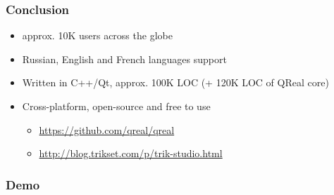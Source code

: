 \documentclass[xetex,mathserif,serif]{beamer}
\begin{document}
	\begin{frame}
		\frametitle{Conclusion}
		\begin{itemize}
			\item approx. 10K users across the globe
			\item Russian, English and French languages support
			\item Written in C++/Qt, approx. 100K LOC (+ 120K LOC of QReal core)
			\item Cross-platform, open-source and free to use
			\begin{itemize}
				\item \href{https://github.com/qreal/qreal}{https://github.com/qreal/qreal}
				\item \href{http://blog.trikset.com/p/trik-studio.html}{http://blog.trikset.com/p/trik-studio.html}
			\end{itemize}
		\end{itemize}
	\end{frame}

	\begin{frame}
		\frametitle{Demo}
		\center{\Huge{\textcolor{cadmiumgreen}{Demonstration}}}
	\end{frame}
\end{document}
